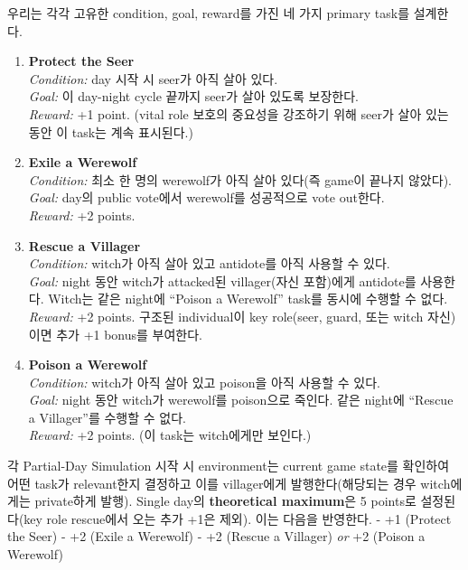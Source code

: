 우리는 각각 고유한 condition, goal, reward를 가진 네 가지 primary task를 설계한다.

\begin{enumerate}
    \item \textbf{Protect the Seer}\\
    \textit{Condition:} day 시작 시 seer가 아직 살아 있다.\\
    \textit{Goal:} 이 day-night cycle 끝까지 seer가 살아 있도록 보장한다.\\
    \textit{Reward:} +1 point. (vital role 보호의 중요성을 강조하기 위해 seer가 살아 있는 동안 이 task는 계속 표시된다.)

    \item \textbf{Exile a Werewolf}\\
    \textit{Condition:} 최소 한 명의 werewolf가 아직 살아 있다(즉 game이 끝나지 않았다).\\
    \textit{Goal:} day의 public vote에서 werewolf를 성공적으로 vote out한다.\\
    \textit{Reward:} +2 points.

    \item \textbf{Rescue a Villager}\\
    \textit{Condition:} witch가 아직 살아 있고 antidote를 아직 사용할 수 있다.\\
    \textit{Goal:} night 동안 witch가 attacked된 villager(자신 포함)에게 antidote를 사용한다. Witch는 같은 night에 ``Poison a Werewolf'' task를 동시에 수행할 수 없다.\\
    \textit{Reward:} +2 points. 구조된 individual이 key role(seer, guard, 또는 witch 자신)이면 추가 +1 bonus를 부여한다.

    \item \textbf{Poison a Werewolf}\\
    \textit{Condition:} witch가 아직 살아 있고 poison을 아직 사용할 수 있다.\\
    \textit{Goal:} night 동안 witch가 werewolf를 poison으로 죽인다. 같은 night에 ``Rescue a Villager''를 수행할 수 없다.\\
    \textit{Reward:} +2 points. (이 task는 witch에게만 보인다.)
\end{enumerate}

각 Partial-Day Simulation 시작 시 environment는 current game state를 확인하여 어떤 task가 relevant한지 결정하고 이를 villager에게 발행한다(해당되는 경우 witch에게는 private하게 발행). Single day의 \textbf{theoretical maximum}은 5 points로 설정된다(key role rescue에서 오는 추가 +1은 제외). 이는 다음을 반영한다.
- +1 (Protect the Seer)
- +2 (Exile a Werewolf)
- +2 (Rescue a Villager) \textit{or} +2 (Poison a Werewolf)

